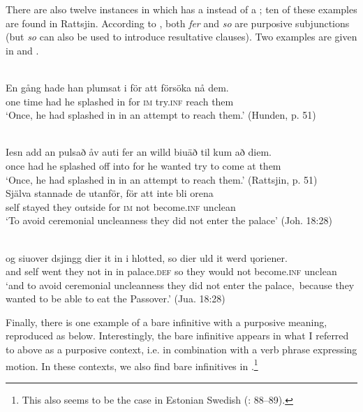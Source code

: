 \documentclass[output=paper]{langscibook}
\begin{document}
There are also twelve instances in which  has a  instead of a ; ten of these examples are found in Rattsjin. According to \citet[491]{AkerbergNystrom2012}, both \textit{fer} and \textit{so} are purposive subjunctions (but \textit{so} can also be used to introduce resultative clauses). Two examples are given in  and .  

\ea
\label{ex:kalm:20}
\ea {}\label{ex:kalm:20a}\\
\gll En gång hade han plumsat i för att försöka nå dem.\\
one time had he splashed in for \textsc{im} try.\textsc{inf} reach them\\ 
\glt ‘Once, he had splashed in in an attempt to reach them.’ (Hunden, p. 51)

\ex {}\label{ex:kalm:20b}\\
\gll Iesn add an pulsað åv auti fer an willd biuäð til kum að diem.\\
once had he splashed off into for he wanted try to come at them\\
\glt ‘Once, he had splashed in in an attempt to reach them.’ (Rattsjin, p. 51)
\z 
\ex
\label{ex:kalm:21}
\ea {}\label{ex:kalm:21a}\\ 
\gll Själva stannade de utanför, för att inte bli orena\\
self stayed they outside for \textsc{im} not become.\textsc{inf} unclean\\
\glt ‘To avoid ceremonial uncleanness they did not enter the palace’ (Joh. 18:28)

\ex {}\label{ex:kalm:21b}\\
\gll og siuover dsjingg dier it in i hlotted, so dier uld it werd \k{u}oriener.\\
and self went they not in in palace.\textsc{def} so they would not become.\textsc{inf} unclean\\
\glt ‘and to avoid ceremonial uncleanness they did not enter the palace,{~}because they wanted to be able to eat the Passover.’ (Jua. 18:28)
\z 
\z\largerpage[2]


Finally, there is one example of a bare infinitive with a purposive meaning, reproduced as  below. Interestingly, the bare infinitive appears in what I referred to above as a purposive context, i.e. in combination with a verb phrase expressing motion. In these contexts, we also find bare infinitives in .\footnote{This also seems to be the case in Estonian Swedish (\citealt{Lagman1958}: 88–89).} 
\end{document}

